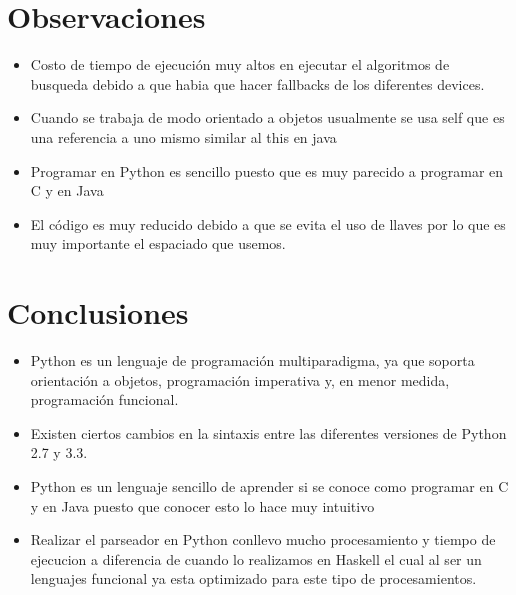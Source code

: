 \documentclass[11pt]{article} %
\begin{document}
\section{\fontsize{14}{0} \bf Observaciones}
\begin{itemize}
\item Costo de tiempo de ejecución muy altos en ejecutar el algoritmos de busqueda debido a que habia que hacer fallbacks de los diferentes devices.
\item Cuando se trabaja de modo orientado a objetos usualmente se usa self que es una referencia a uno mismo similar al this en java
\item Programar en Python es sencillo puesto que es muy parecido a programar en C y en Java 
\item El código es muy reducido debido a que se evita el uso de llaves por lo que es muy importante el espaciado que usemos.

\end{itemize}


\section{\fontsize{14}{0} \bf Conclusiones}

\begin{itemize}
\item Python es un lenguaje de programación multiparadigma, ya que soporta orientación a objetos, programación imperativa y, en menor medida, programación funcional.
\item Existen ciertos cambios en la sintaxis entre las diferentes versiones de Python 2.7 y 3.3.
\item Python es un lenguaje sencillo de aprender si se conoce como programar en C y en Java puesto que conocer esto lo hace muy intuitivo
\item Realizar el parseador en Python conllevo mucho procesamiento y tiempo de ejecucion a diferencia de cuando lo realizamos en Haskell el cual al ser un lenguajes funcional ya esta optimizado para este tipo de procesamientos.

\end{itemize}
\end{document}
